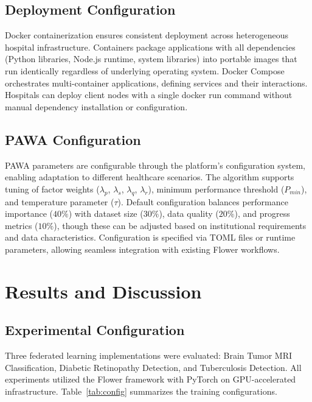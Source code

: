 \documentclass[conference]{IEEEtran}
\begin{document}
\subsection{Deployment Configuration}
Docker containerization ensures consistent deployment across heterogeneous hospital infrastructure. Containers package applications with all dependencies (Python libraries, Node.js runtime, system libraries) into portable images that run identically regardless of underlying operating system. Docker Compose orchestrates multi-container applications, defining services and their interactions. Hospitals can deploy client nodes with a single docker run command without manual dependency installation or configuration.

\subsection{PAWA Configuration}
PAWA parameters are configurable through the platform's configuration system, enabling adaptation to different healthcare scenarios. The algorithm supports tuning of factor weights ($\lambda_p$, $\lambda_s$, $\lambda_q$, $\lambda_r$), minimum performance threshold ($P_{min}$), and temperature parameter ($\tau$). Default configuration balances performance importance ($40\%$) with dataset size ($30\%$), data quality ($20\%$), and progress metrics ($10\%$), though these can be adjusted based on institutional requirements and data characteristics. Configuration is specified via TOML files or runtime parameters, allowing seamless integration with existing Flower workflows.

\section{Results and Discussion}

\subsection{Experimental Configuration}
Three federated learning implementations were evaluated: Brain Tumor MRI Classification, Diabetic Retinopathy Detection, and Tuberculosis Detection. All experiments utilized the Flower framework with PyTorch on GPU-accelerated infrastructure. Table~\ref{tab:config} summarizes the training configurations.
\end{document}
